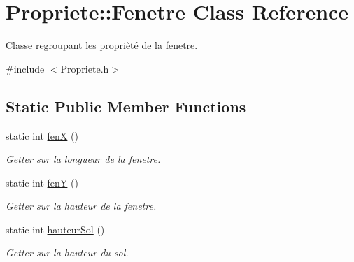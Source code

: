 \hypertarget{classPropriete_1_1Fenetre}{\section{Propriete\-:\-:Fenetre Class Reference}
\label{classPropriete_1_1Fenetre}
}


Classe regroupant les proprièté de la fenetre.  




{\ttfamily \#include $<$Propriete.\-h$>$}

\subsection*{Static Public Member Functions}
\begin{DoxyCompactItemize}
\item 
\hypertarget{classPropriete_1_1Fenetre_aa9caf2a9dcf6fe27e3a16fc5a0555012}{static int \hyperlink{classPropriete_1_1Fenetre_aa9caf2a9dcf6fe27e3a16fc5a0555012}{fen\-X} ()}\label{classPropriete_1_1Fenetre_aa9caf2a9dcf6fe27e3a16fc5a0555012}

\begin{DoxyCompactList}\small\item\em Getter sur la longueur de la fenetre. \end{DoxyCompactList}\item 
\hypertarget{classPropriete_1_1Fenetre_a1a63f9dc6edbc9892070c0d4b9ec489a}{static int \hyperlink{classPropriete_1_1Fenetre_a1a63f9dc6edbc9892070c0d4b9ec489a}{fen\-Y} ()}\label{classPropriete_1_1Fenetre_a1a63f9dc6edbc9892070c0d4b9ec489a}

\begin{DoxyCompactList}\small\item\em Getter sur la hauteur de la fenetre. \end{DoxyCompactList}\item 
\hypertarget{classPropriete_1_1Fenetre_ab9f81f80b56bebb5f4a352e4232d4561}{static int \hyperlink{classPropriete_1_1Fenetre_ab9f81f80b56bebb5f4a352e4232d4561}{hauteur\-Sol} ()}\label{classPropriete_1_1Fenetre_ab9f81f80b56bebb5f4a352e4232d4561}

\begin{DoxyCompactList}\small\item\em Getter sur la hauteur du sol. \end{DoxyCompactList}\end{DoxyCompactItemize}

